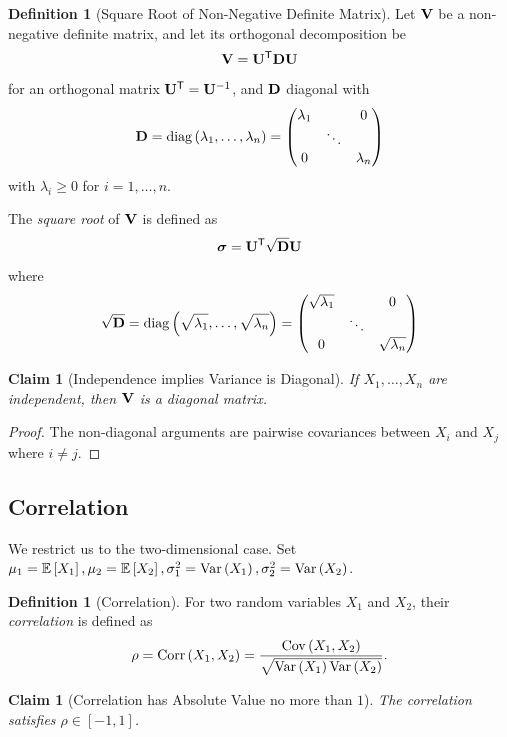 \documentclass{article}
\newtheorem{claim}[theorem]{Claim}
\theoremstyle{definition}
\newtheorem{definition}[theorem]{Definition}
\theoremstyle{remark}
\newcommand{\Expt}{\mathbb{E}}
\newcommand{\inverse}{^{-1}}
\newcommand{\transpose}{^{\mathsf{T}}}
\newcommand{\ccintv}[2]{[#1,#2]}
\newcommand{\pmqty}[1]{\begin{pmatrix}#1\end{pmatrix}}
\newcommand{\Var}{\operatorname{Var}}
\newcommand{\Corr}{\operatorname{Corr}}
\newcommand{\Cov}{\operatorname{Cov}}
\newcommand{\diag}{\operatorname{diag}}
\begin{document}
\begin{definition}[Square Root of Non-Negative Definite Matrix]
    \label{def:sqrt-non-negative-definite-matrix}%
    Let \(\vb{V}\) be a non-negative definite matrix, and let its orthogonal decomposition be
    \[
        \vb{V} = \vb{U}\transpose \vb{D} \vb{U}
    \]
    for an orthogonal matrix \(\vb{U}\transpose = \vb{U}\inverse\), and \(\vb{D}\) diagonal with
    \[
        \vb{D} = \diag\pqty{\lambda_1, \ldots, \lambda_n} = \pmqty{\lambda_1 & & 0 \\ & \ddots & \\ 0 & & \lambda_n}
    \]
    with \(\lambda_i \geq 0\) for \(i = 1, \ldots, n\).

    The \emph{square root} of \(\vb{V}\) is defined as
    \[
        \vb*{\sigma} = \vb{U}\transpose \sqrt{\vb{D}} \vb{U}
    \]
    where
    \[
        \sqrt{\vb{D}} = \diag\pqty{\sqrt{\lambda_1}, \ldots, \sqrt{\lambda_n}} = \pmqty{\sqrt{\lambda_1} & & 0 \\ & \ddots & \\ 0 & & \sqrt{\lambda_n}}
    \]
\end{definition}

\begin{claim}[Independence implies Variance is Diagonal]
    \label{claim:indep-diagonal-variance}%
    If \(X_1, \ldots, X_n\) are independent, then \(\vb{V}\) is a diagonal matrix.
\end{claim}

\begin{proof}
    The non-diagonal arguments are pairwise covariances between \(X_i\) and \(X_j\) where \(i \neq j\).
\end{proof}

\subsection{Correlation}

We restrict us to the two-dimensional case. Set \(\mu_1 = \Expt\bqty{X_1}, \mu_2 = \Expt\bqty{X_2}, \sigma_1^2 = \Var\pqty{X_1}, \sigma_2^2 = \Var\pqty{X_2}\).

\begin{definition}[Correlation]
   \label{def:corr}%
    For two random variables \(X_1\) and \(X_2\), their \emph{correlation} is defined as
    \[
        \rho = \Corr\pqty{X_1, X_2} = \frac{\Cov\pqty{X_1, X_2}}{\sqrt{\Var\pqty{X_1} \Var\pqty{X_2}}}.
    \]
\end{definition}

\begin{claim}[Correlation has Absolute Value no more than \(1\)]
    \label{claim:corr-abs-val-no-more-one}%
    The correlation satisfies \(\rho \in \ccintv{-1}{1}\).
\end{claim}
\end{document}
